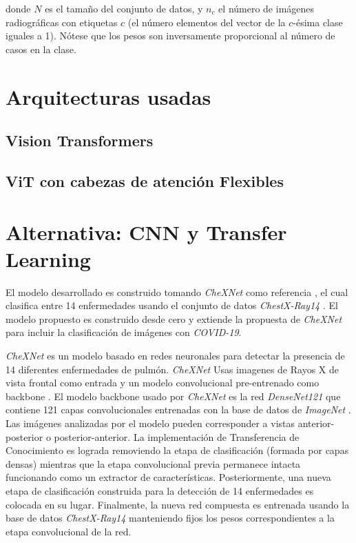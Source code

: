 {donde $N$ es el tamaño del conjunto de datos, y $n_c$ el número de imágenes radiográficas con
etiquetas $c$ (el número elementos del vector de la $c$-ésima clase iguales a 1). Nótese que los
pesos son inversamente proporcional al número de casos en la clase.


\section{Arquitecturas usadas}
\subsection{Vision Transformers}
\subsection{ViT con cabezas de atención Flexibles}
\section{Alternativa: CNN y Transfer Learning}

El modelo desarrollado es construido tomando \textit{CheXNet} como referencia
\cite{rajpurkar2018deep}, el cual clasifica entre 14 enfermedades
usando el conjunto de datos \textit{ChestX-Ray14} \cite{wang2017chestx}. El modelo propuesto es
construido desde cero y extiende la propuesta de \textit{CheXNet} para incluir la clasificación de
imágenes con \textit{COVID-19}.

\textit{CheXNet} es un modelo basado en redes neuronales para detectar la presencia de 14 diferentes
enfermedades de pulmón. \textit{CheXNet} Usas imagenes de Rayos X de vista frontal como entrada y
un modelo convolucional pre-entrenado como backbone \cite{rajpurkar2018deep}. El modelo backbone usado
por \textit{CheXNet} es la red \textit{DenseNet121} \cite{huang2017densely} que contiene 121 capas
convolucionales entrenadas con la base de datos de \textit{ImageNet} \cite{ILSVRC15}. Las imágenes
analizadas por el modelo pueden corresponder a vistas anterior-posterior o posterior-anterior. La
implementación de Transferencia de Conocimiento es lograda removiendo la etapa de clasificación
(formada por capas densas) mientras que la etapa convolucional previa permanece intacta funcionando
como un extractor de características. Posteriormente, una nueva etapa de clasificación construida
para la detección de 14 enfermedades es colocada en su lugar. Finalmente, la nueva red compuesta
es entrenada usando la base de datos \textit{ChestX-Ray14} manteniendo fijos los pesos
correspondientes a la etapa convolucional de la red.

}
